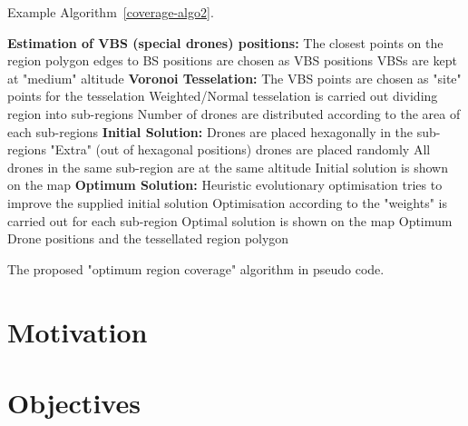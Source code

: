 \documentclass{unicam_thesis}
\theoremstyle{definition} \newtheorem{esempio}{Esempio}[chapter]
\theoremstyle{definition}
\begin{document}
  Example Algorithm~\ref{coverage-algo2}.
    
    \begin{algorithm}[H]
        \SetAlgoLined
        \BlankLine
        \BlankLine
        \textbf{Estimation of VBS (special drones) positions:}\;
        The closest points on the region polygon edges to BS positions are chosen as VBS positions\;
        VBSs are kept at "medium" altitude\;
        \BlankLine
        \textbf{Voronoi Tesselation:}\;
        The VBS points are chosen as "site" points for the tesselation\;
        Weighted/Normal tesselation is carried out dividing region into sub-regions\;
        Number of drones are distributed according to the area of each sub-regions\;
        \BlankLine
        \textbf{Initial Solution:}\;
        Drones are placed hexagonally in the sub-regions\;
        "Extra" (out of hexagonal positions) drones are placed randomly\;
        All drones in the same sub-region are at the same altitude\;
        Initial solution is shown on the map\;
        \BlankLine
        \textbf{Optimum Solution:}\;
        Heuristic evolutionary optimisation tries to improve the supplied initial solution\;
        Optimisation according to the "weights" is carried out for each sub-region\;
        Optimal solution is shown on the map\;
        \BlankLine
        \Return Optimum Drone positions and the tessellated region polygon
        \caption{The proposed "optimum region coverage" algorithm in pseudo code.}\label{coverage-algo2}
    \end{algorithm}
    
    \section{Motivation}
  
    
    \section{Objectives}
     
\end{document}
